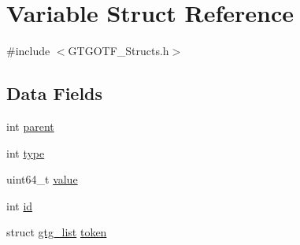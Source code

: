 \hypertarget{structVariable}{\section{Variable Struct Reference}
\label{structVariable}
}


{\ttfamily \#include $<$G\-T\-G\-O\-T\-F\-\_\-\-Structs.\-h$>$}

\subsection*{Data Fields}
\begin{DoxyCompactItemize}
\item 
int \hyperlink{structVariable_a3cb36d32e3d836c934ffdcb8e6b2548c}{parent}
\item 
int \hyperlink{structVariable_a659e966bd442dbde52df805e15005bf9}{type}
\item 
uint64\-\_\-t \hyperlink{structVariable_a7e8220b03f0a1eb35030f642eb8c4fb8}{value}
\item 
int \hyperlink{structVariable_a8d689afc1cb0df2adc60fbfdc9cbae34}{id}
\item 
struct \hyperlink{structgtg__list}{gtg\-\_\-list} \hyperlink{structVariable_a0bc63e6674147c2277c89b3381eeaa91}{token}
\end{DoxyCompactItemize}


